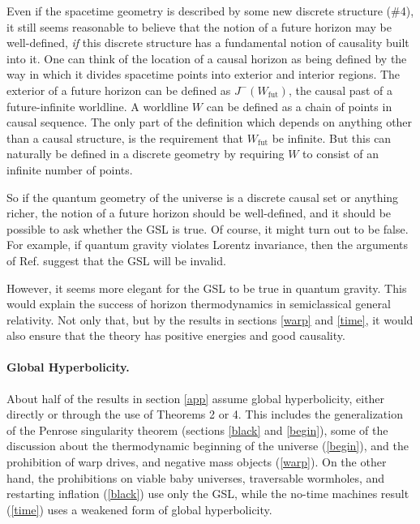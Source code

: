 \documentclass[12pt]{article}
\begin{document}
Even if the spacetime geometry is described by some new discrete structure (\#4), it still seems reasonable to believe that the notion of a future horizon may be well-defined, \emph{if} this discrete structure has a fundamental notion of causality built into it.  One can think of the location of a causal horizon as being defined by the way in which it divides spacetime points into exterior and interior regions.  The exterior of a future horizon can be defined as $J^-(W_\mathrm{fut})$, the causal past of a future-infinite worldline.  A worldline $W$ can be defined as a chain of points in causal sequence.  The only part of the definition which depends on anything other than a causal structure, is the requirement that $W_\mathrm{fut}$ be infinite.  But this can naturally be defined in a discrete geometry by requiring $W$ to consist of an infinite number of points.

So if the quantum geometry of the universe is a discrete causal set or anything richer, the notion of a future horizon should be well-defined, and it should be possible to ask whether the GSL is true.  Of course, it might turn out to be false.  For example, if quantum gravity violates Lorentz invariance, then the arguments of Ref. \cite{2speed} suggest that the GSL will be invalid.

However, it seems more elegant for the GSL to be true in quantum gravity.  This would explain the success of horizon thermodynamics in semiclassical general relativity.  Not only that, but by the results in sections \ref{warp} and \ref{time}, it would also ensure that the theory has positive energies and good causality.

\paragraph{Global Hyperbolicity.}

About half of the results in section \ref{app} assume global hyperbolicity, either directly or through the use of Theorems 2 or 4.  This includes the generalization of the Penrose singularity theorem (sections \ref{black} and \ref{begin}), some of the discussion about the thermodynamic beginning of the universe (\ref{begin}), and the prohibition of warp drives, and negative mass objects (\ref{warp}).  On the other hand, the prohibitions on viable baby universes, traversable wormholes, and restarting inflation (\ref{black}) use only the GSL, while the no-time machines result (\ref{time}) uses a weakened form of global hyperbolicity.
\end{document}
